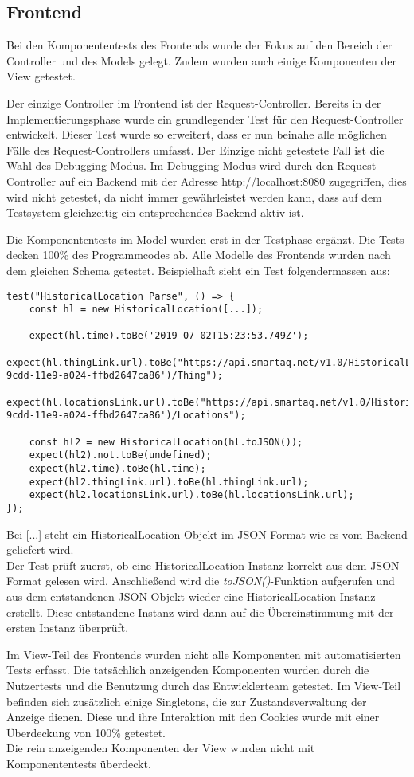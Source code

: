 \subsection{Frontend}
Bei den Komponententests des Frontends wurde der Fokus auf den Bereich der Controller und des Models gelegt.
Zudem wurden auch einige Komponenten der View getestet.

Der einzige Controller im Frontend ist der Request-Controller.
Bereits in der Implementierungsphase wurde ein grundlegender Test für den Request-Controller entwickelt.
Dieser Test wurde so erweitert, dass er nun beinahe alle möglichen Fälle des Request-Controllers umfasst.
Der Einzige nicht getestete Fall ist die Wahl des Debugging-Modus.
Im Debugging-Modus wird durch den Request-Controller auf ein Backend mit der Adresse http://localhost:8080 zugegriffen, dies wird nicht getestet, da nicht immer gewährleistet werden kann, dass auf dem Testsystem gleichzeitig ein entsprechendes Backend aktiv ist.

Die Komponententests im Model wurden erst in der Testphase ergänzt.
Die Tests decken 100\% des Programmcodes ab.
Alle Modelle des Frontends wurden nach dem gleichen Schema getestet.
Beispielhaft sieht ein Test folgendermassen aus:
\begin{lstlisting}[style=customjs]
test("HistoricalLocation Parse", () => {
    const hl = new HistoricalLocation([...]);

    expect(hl.time).toBe('2019-07-02T15:23:53.749Z');
    expect(hl.thingLink.url).toBe("https://api.smartaq.net/v1.0/HistoricalLocations('66c68826-9cdd-11e9-a024-ffbd2647ca86')/Thing");
    expect(hl.locationsLink.url).toBe("https://api.smartaq.net/v1.0/HistoricalLocations('66c68826-9cdd-11e9-a024-ffbd2647ca86')/Locations");

    const hl2 = new HistoricalLocation(hl.toJSON());
    expect(hl2).not.toBe(undefined);
    expect(hl2.time).toBe(hl.time);
    expect(hl2.thingLink.url).toBe(hl.thingLink.url);
    expect(hl2.locationsLink.url).toBe(hl.locationsLink.url);
});
\end{lstlisting}
Bei [...] steht ein HistoricalLocation-Objekt im \gls{JSON}-Format wie es vom Backend geliefert wird.
\\
Der Test prüft zuerst, ob eine HistoricalLocation-Instanz korrekt aus dem \gls{JSON}-Format gelesen wird.
Anschließend wird die \textit{toJSON()}-Funktion aufgerufen und aus dem entstandenen JSON-Objekt wieder eine HistoricalLocation-Instanz erstellt.
Diese entstandene Instanz wird dann auf die Übereinstimmung mit der ersten Instanz überprüft.

Im View-Teil des Frontends wurden nicht alle Komponenten mit automatisierten Tests erfasst.
Die tatsächlich anzeigenden Komponenten wurden durch die Nutzertests und die Benutzung durch das Entwicklerteam getestet.
Im View-Teil befinden sich zusätzlich einige Singletons, die zur Zustandsverwaltung der Anzeige dienen.
Diese und ihre Interaktion mit den Cookies wurde mit einer Überdeckung von 100\% getestet.
\\
Die rein anzeigenden Komponenten der View wurden nicht mit Komponententests überdeckt. 
